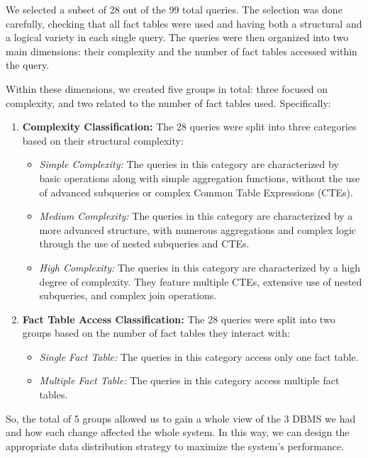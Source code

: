 \documentclass[conference]{IEEEtran}
\begin{document}
We selected a subset of 28 out of the 99 total queries. The selection was done carefully, checking that all fact tables were used and having both a structural and a logical variety in each single query. The queries were then organized into two main dimensions: their complexity and the number of fact tables accessed within the query.

Within these dimensions, we created five groups in total: three focused on complexity, and two related to the number of fact tables used. Specifically:

\begin{enumerate}
    \item \textbf{Complexity Classification:} The 28 queries were split into three categories based on their structural complexity:
          \begin{itemize}
              \item \textit{Simple Complexity:} The queries in this category are characterized by basic operations along with simple aggregation functions, without the use of advanced subqueries or complex Common Table Expressions (CTEs).
              \item \textit{Medium Complexity:} The queries in this category are characterized by a more advanced structure, with numerous aggregations and complex logic through the use of nested subqueries and CTEs.
              \item \textit{High Complexity:} The queries in this category are characterized by a high degree of complexity. They feature multiple CTEs, extensive use of nested subqueries, and complex join operations.
          \end{itemize}
    \item \textbf{Fact Table Access Classification:} The 28 queries were split into two groups based on the number of fact tables they interact with:
          \begin{itemize}
              \item \textit{Single Fact Table:} The queries in this category access only one fact table.
              \item \textit{Multiple Fact Table:} The queries in this category access multiple fact tables.
          \end{itemize}
\end{enumerate}

So, the total of 5 groups allowed us to gain a whole view of the 3 DBMS we had and how each change affected the whole system. In this way, we can design the appropriate data distribution strategy to maximize the system’s performance.
\end{document}
